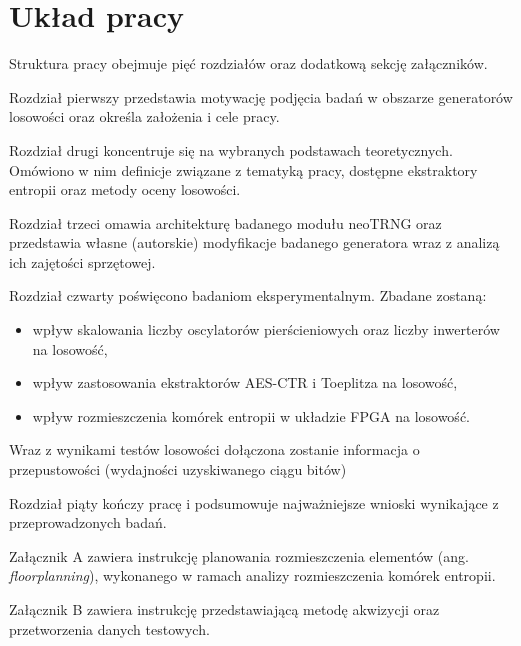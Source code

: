 \section{Układ pracy}

\noindent Struktura pracy obejmuje pięć rozdziałów oraz dodatkową sekcję załączników. 

Rozdział pierwszy przedstawia motywację podjęcia badań w obszarze generatorów 
losowości oraz określa założenia i cele pracy. 

Rozdział drugi koncentruje się na wybranych podstawach teoretycznych. Omówiono w nim 
definicje związane z tematyką pracy, dostępne ekstraktory entropii oraz metody 
oceny losowości.

Rozdział trzeci omawia architekturę badanego modułu neoTRNG oraz przedstawia 
własne (autorskie) modyfikacje badanego generatora wraz z analizą ich zajętości sprzętowej.  

Rozdział czwarty poświęcono badaniom eksperymentalnym. Zbadane zostaną: 
\begin{itemize}
    \item wpływ skalowania liczby oscylatorów pierścieniowych oraz liczby 
    inwerterów na losowość, 
    \item wpływ zastosowania ekstraktorów AES-CTR i Toeplitza na losowość, 
    \item wpływ rozmieszczenia komórek entropii w układzie FPGA na losowość. 
\end{itemize}

Wraz z wynikami testów losowości dołączona zostanie informacja o przepustowości  
(wydajności uzyskiwanego ciągu bitów)

Rozdział piąty kończy pracę i podsumowuje najważniejsze wnioski wynikające z 
przeprowadzonych badań.

Załącznik A zawiera instrukcję planowania rozmieszczenia elementów 
(ang. \textit{floorplanning}), wykonanego w ramach analizy rozmieszczenia 
komórek entropii.

Załącznik B zawiera instrukcję przedstawiającą metodę akwizycji oraz przetworzenia 
danych testowych.

